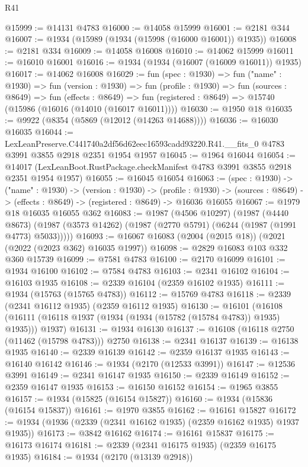 \begin{lexlean}{R41}
\begin{coremodule}
@15999 := @14131 @4783
@16000 := @14058 @15999
@16001 := @2181 @344
@16007 := @1934 (@15989 (@1934 (@15998 (@16000 @16001)) @1935))
@16008 := @2181 @334
@16009 := @14058 @16008
@16010 := @14062 @15999
@16011 := @16010 @16001
@16016 := @1934 (@1934 (@16007 (@16009 @16011)) @1935)
@16017 := @14062 @16008
@16029 := fun (spec : @1930) =>
  fun ("name" : @1930) =>
  fun (version : @1930) =>
  fun (profile : @1930) =>
  fun (sources : @8649) =>
  fun (effects : @8649) =>
  fun (registered : @8649) => @15740 (@15986 (@16016 (@14010 (@16017 @16011))))
@16030 := @1950 @18
@16035 := @9922 (@8354 (@5869 (@12012 (@14263 @14688))))
@16036 := @16030 @16035
@16044 := LexLeanPreserve.C441740a2df56d62eec16593cadd93220.R41.__fits_0
    @4783
    @3991
    @3855
    @2918
    @2351
    @1954
    @1957
@16045 := @1964 @16044
@16054 := @14017 (LexLeanBoot.RustPackage.checkManifest @4783 @3991 @3855 @2918 @2351 @1954 @1957)
@16055 := @16045 @16054
@16063 := (spec : @1930) ->
  ("name" : @1930) ->
  (version : @1930) ->
  (profile : @1930) ->
  (sources : @8649) -> (effects : @8649) -> (registered : @8649) -> @16036 @16055
@16067 := @1979 @18 @16035 @16055 @362
@16083 := @1987
    (@4506 @10297)
    (@1987
      (@4440 @8673)
      (@1987 (@3573 @14262) (@1987 (@2770 @5791) (@6244 (@1987 (@1991 @4773) @5033)))))
@16093 := @16067 @16083 (@2004 (@2015 @18)) (@2021 (@2022 (@2023 @362) @16035 @1997))
@16098 := @2829 @16083 @103 @332 @360 @15739
@16099 := @7581 @4783
@16100 := @2170 @16099
@16101 := @1934 @16100
@16102 := @7584 @4783
@16103 := @2341 @16102
@16104 := @16103 @1935
@16108 := @2339 @16104 (@2359 @16102 @1935)
@16111 := @1934 (@15763 (@15765 @4783))
@16112 := @15769 @4783
@16118 := @2339 (@2341 @16112 @1935) (@2359 @16112 @1935)
@16130 := @16101
    (@16108 (@16111 (@16118 @1937 (@1934 (@1934 (@15782 (@15784 @4783)) @1935) @1935))) @1937)
@16131 := @1934 @16130
@16137 := @16108 (@16118 @2750 (@11462 (@15798 @4783))) @2750
@16138 := @2341 @16137
@16139 := @16138 @1935
@16140 := @2339 @16139
@16142 := @2359 @16137 @1935
@16143 := @16140 @16142
@16146 := @1934 (@2170 (@12533 @3991))
@16147 := @12536 @3991
@16149 := @2341 @16147 @1935
@16150 := @2339 @16149
@16152 := @2359 @16147 @1935
@16153 := @16150 @16152
@16154 := @1965 @3855
@16157 := @1934 (@15825 (@16154 @15827))
@16160 := @1934 (@15836 (@16154 @15837))
@16161 := @1970 @3855
@16162 := @16161 @15827
@16172 := @1934 (@1936 (@2339 (@2341 @16162 @1935) (@2359 @16162 @1935) @1937 @1935))
@16173 := @3842 @16162
@16174 := @16161 @15837
@16175 := @16173 @16174
@16181 := @2339 (@2341 @16175 @1935) (@2359 @16175 @1935)
@16184 := @1934 (@2170 (@13139 @2918))

\end{coremodule}
\end{lexlean}
